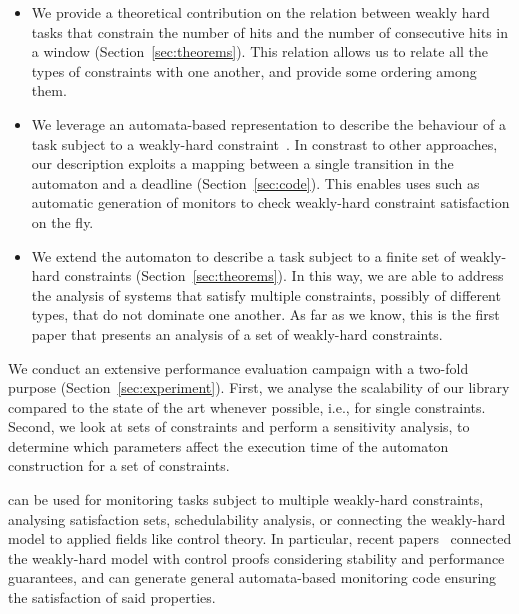 \begin{itemize}

    \item We provide a theoretical contribution on the relation between weakly hard tasks that constrain the number of hits and the number of consecutive hits in a window (Section~\ref{sec:theorems}). 
        This relation allows us to relate all the types of constraints with one another, and provide some ordering among them. 

    \item We leverage an automata-based representation to describe the behaviour of a task subject to a weakly-hard constraint~\cite{Horssen:2016, Linsenmayer:2021}.
        In constrast to other approaches, our description exploits a mapping between a single transition in the automaton and a deadline (Section~\ref{sec:code}).
        This enables uses such as automatic generation of monitors to check weakly-hard constraint satisfaction on the fly.

    \item We extend the automaton to describe a task subject to a finite set of weakly-hard constraints (Section~\ref{sec:theorems}).
        In this way, we are able to address the analysis of systems that satisfy multiple constraints, possibly of different types, that do not dominate one another.
        As far as we know, this is the first paper that presents an analysis of a set of weakly-hard constraints.

\end{itemize}

We conduct an extensive performance evaluation campaign with a two-fold purpose (Section~\ref{sec:experiment}). 
First, we analyse the scalability of our library compared to the state of the art whenever possible, i.e., for single constraints. 
Second, we look at sets of constraints and perform a sensitivity analysis, to determine which parameters affect the execution time of the automaton construction for a set of constraints. 

\tool{} can be used for monitoring tasks subject to multiple weakly-hard constraints, analysing satisfaction sets, schedulability analysis, or connecting the weakly-hard model to applied fields like control theory.
In particular, recent papers~\cite{Pazzaglia:2018, Maggio:2020, Vreman:2021, Linsenmayer:2021, Linsenmayer:2017} connected the weakly-hard model with control proofs considering stability and performance guarantees, and \tool{} can generate general automata-based monitoring code ensuring the satisfaction of said properties.
